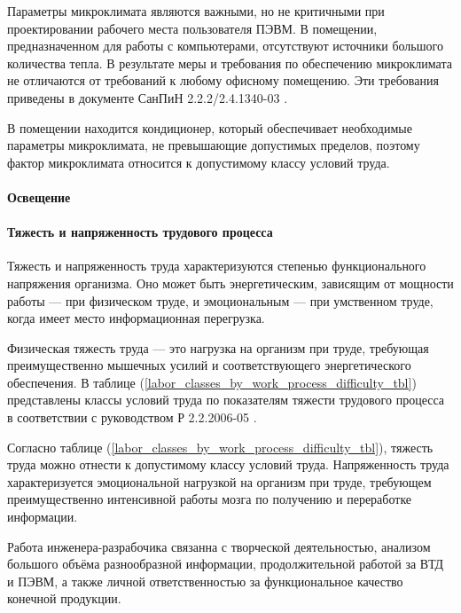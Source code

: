 Параметры микроклимата являются важными, но не критичными при проектировании
рабочего места пользователя ПЭВМ. В помещении, предназначенном для работы с
компьютерами, отсутствуют источники большого количества тепла. В результате меры
и требования по обеспечению микроклимата не отличаются от требований к любому
офисному помещению. Эти требования приведены в документе СанПиН 2.2.2/2.4.1340-03
\cite{ecology_sanpin_1340_03}.

В помещении находится кондиционер, который обеспечивает необходимые параметры
микроклимата, не превышающие допустимых пределов, поэтому фактор микроклимата
относится к допустимому классу условий труда.

\paragraph{Освещение}

\paragraph{Тяжесть и напряженность трудового процесса}

Тяжесть и напряженность труда характеризуются степенью функционального напряжения
организма. Оно может быть энергетическим, зависящим от мощности работы — при
физическом труде, и эмоциональным — при умственном труде, когда имеет место
информационная перегрузка.

Физическая тяжесть труда — это нагрузка на организм при труде, требующая
преимущественно мышечных усилий и соответствующего энергетического обеспечения.
В таблице (\ref{labor_classes_by_work_process_difficulty_tbl}) представлены классы
условий труда по показателям тяжести трудового процесса в соответствии с
руководством Р 2.2.2006-05 \cite{ecology_man_2_2_2006_05}.




Согласно таблице (\ref{labor_classes_by_work_process_difficulty_tbl}), тяжесть
труда можно отнести к допустимому классу условий труда. Напряженность труда
характеризуется эмоциональной нагрузкой на организм при труде, требующем
преимущественно интенсивной работы мозга по получению и переработке информации.

Работа инженера-разрабочика связанна с творческой деятельностью, анализом большого
объёма разнообразной информации, продолжительной работой за ВТД и ПЭВМ, а также
личной ответственностью за функциональное качество конечной продукции.

